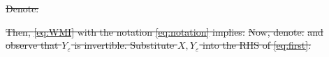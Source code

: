 \documentclass[ba]{imsart}
\newcommand{\eps}{\varepsilon}
\newcommand{\obs}{\mathcal{O}}
\newcommand{\fwd}{\mathcal{F}}
\theoremstyle{plain}
\theoremstyle{definition}
\theoremstyle{remark}
\providecommand{\DIFdeltex}[1]{{\protect\color{red}\sout{#1}}}                      %
\providecommand{\DIFdelbegin}{} %
\providecommand{\DIFdel}[1]{\texorpdfstring{\DIFdeltex{#1}}{}} %
\newcommand{\DIFscaledelfig}{0.5}
\newlength{\DIFdelgraphicswidth} %
\newlength{\DIFdelgraphicsheight} %
\newcommand{\DIFdelincludegraphics}[2][]{%
\sbox{\DIFdelgraphicsbox}{\DIFOincludegraphics[#1]{#2}}%
\settoboxwidth{\DIFdelgraphicswidth}{\DIFdelgraphicsbox} %
\settoboxtotalheight{\DIFdelgraphicsheight}{\DIFdelgraphicsbox} %
\scalebox{\DIFscaledelfig}{%
\parbox[b]{\DIFdelgraphicswidth}{\usebox{\DIFdelgraphicsbox}\\[-\baselineskip] \rule{\DIFdelgraphicswidth}{0em}}\llap{\resizebox{\DIFdelgraphicswidth}{\DIFdelgraphicsheight}{%
\setlength{\unitlength}{\DIFdelgraphicswidth}%
\begin{picture}(1,1)%
\thicklines\linethickness{2pt} %
{\color[rgb]{1,0,0}\put(0,0){\framebox(1,1){}}}%
{\color[rgb]{1,0,0}\put(0,0){\line( 1,1){1}}}%
{\color[rgb]{1,0,0}\put(0,1){\line(1,-1){1}}}%
\end{picture}%
}\hspace*{3pt}}} %
} %
\DeclareRobustCommand{\DIFdelbegin}{\DIFOdelbegin \let\includegraphics\DIFdelincludegraphics} %
\begin{document}
\DIFdelbegin \DIFdel{Denote:
  }%

\DIFdel{Then, \eqref{eq:WMI} with the notation \eqref{eq:notation} implies:
  }%
\DIFdel{Now, denote:
  }%
\DIFdel{and observe that $Y_{\eps}$ is invertible. Substitute $X, Y_{\eps}$
  into the RHS of \eqref{eq:first}:
   }%
\end{document}
